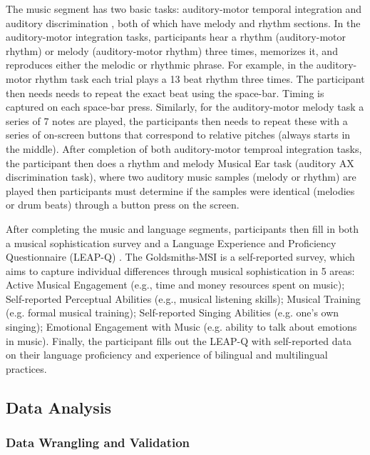 \documentclass[a4paper]{article}
\begin{document}
The music segment has two basic tasks: auditory-motor temporal integration \cite{Kachlicka_Saito_Tierney_2019} and auditory discrimination \cite[MET]{Wallentin_Nielsen_Friis-Olivarius_Vuust_Vuust_2010}, both of which have melody and rhythm sections. In the auditory-motor integration tasks, participants hear a rhythm (auditory-motor rhythm) or melody (auditory-motor rhythm) three times, memorizes it, and reproduces either the melodic or rhythmic phrase. For example, in the auditory-motor rhythm task each trial plays a 13 beat rhythm three times. The participant then needs needs to repeat the exact beat using the space-bar. Timing is captured on each space-bar press. Similarly, for the auditory-motor melody task a series of 7 notes are played, the participants then needs to repeat these with a series of on-screen buttons that correspond to relative pitches (always starts in the middle). After completion of both auditory-motor temproal integration tasks, the participant then does a rhythm and melody Musical Ear task \cite{Wallentin_Nielsen_Friis-Olivarius_Vuust_Vuust_2010} (auditory AX discrimination task), where two auditory music samples (melody or rhythm) are played then participants must determine if the samples were identical (melodies or drum beats) through a button press on the screen. 

After completing the music and language segments, participants then fill in both a musical sophistication survey \cite[Gold-MSI;]{Müllensiefen_Gingras_Musil_Stewart_2014} and a Language Experience and Proficiency Questionnaire (LEAP-Q) \cite{Marian_Blumenfeld_Kaushanskaya_2007}. The Goldsmiths-MSI is a self-reported survey, which aims to capture individual differences through musical sophistication in 5 areas: Active Musical Engagement (e.g., time and money resources spent on music); Self-reported Perceptual Abilities (e.g., musical listening skills); Musical Training (e.g. formal musical training); Self-reported Singing Abilities (e.g. one’s own singing); Emotional Engagement with Music (e.g. ability to talk about emotions in music). Finally, the participant fills out the LEAP-Q with self-reported data on their language proficiency and experience of bilingual and multilingual practices. 

\subsection{Data Analysis}
\subsubsection{Data Wrangling and Validation}
\end{document}
